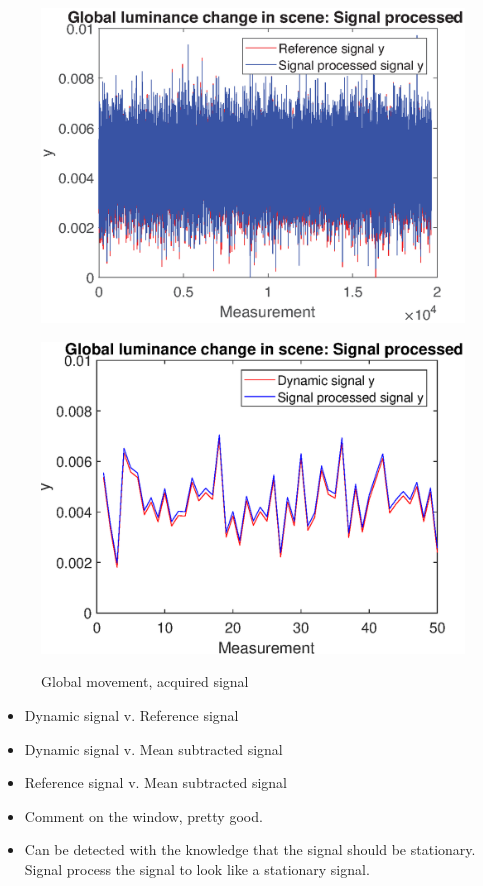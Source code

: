 \begin{figure}[H]
\begin{minipage}[t]{0.495\textwidth}
    \includegraphics[width=1\textwidth]{result/dynamic/lum/intense_change_sp_ref1.eps}
    \label{fig:lum_sig_3}
\end{minipage}
\begin{minipage}[t]{0.495\textwidth}
    \includegraphics[width = \textwidth]{result/dynamic/lum/intense_change_sp_ref_win.eps}
    \label{fig:lum_sig_4}
\end{minipage}
    \caption{Global movement, acquired signal}
    \label{fig:lum_sig}
\end{figure}

\begin{itemize}
    \item Dynamic signal v. Reference signal
    \item Dynamic signal v. Mean subtracted signal
    \item Reference signal v. Mean subtracted signal
    \item Comment on the window, pretty good.
    \item Can be detected with the knowledge that the signal should be stationary. Signal process the signal to look like a stationary signal.
\end{itemize}
